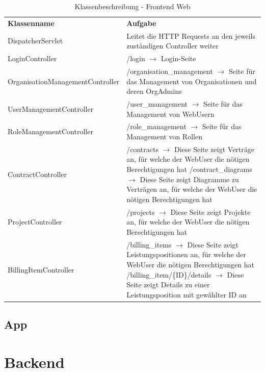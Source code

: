 \begin{table}[h]
	\centering
	\begin{tabularx}{\textwidth}{X X}
		\rowcolor[HTML]{C0C0C0} 
		\textbf{Klassenname} & \textbf{Aufgabe} \\
		DispatcherServlet & Leitet die HTTP Requests an den jeweils zuständigen Controller weiter \\
		\rowcolor[HTML]{E7E7E7} 
		LoginController & /login $\rightarrow$ Login-Seite \\
		OrganisationManagementController & /organisation_management $\rightarrow$ Seite für das Management von Organisationen und deren OrgAdmins \\
		\rowcolor[HTML]{E7E7E7} 
		UserManagementController & /user_management $\rightarrow$ Seite für das Management von WebUsern \\
		RoleManagementController & /role_management $\rightarrow$ Seite für das Management von Rollen \\
		\rowcolor[HTML]{E7E7E7} 
		ContractController & /contracts $\rightarrow$ Diese Seite zeigt Verträge an, für welche der WebUser die nötigen Berechtigungen hat \newline
		/contract_diagrams $\rightarrow$ Diese Seite zeigt Diagramme zu Verträgen an, für welche der WebUser die nötigen Berechtigungen hat \\
		ProjectController & /projects $\rightarrow$ Diese Seite zeigt Projekte an, für welche der WebUser die nötigen Berechtigungen hat \\
		\rowcolor[HTML]{E7E7E7} 
		BillingItemController & /billing_items $\rightarrow$ Diese Seite zeigt Leistungspositionen an, für welche der WebUser die nötigen Berechtigungen hat \newline
		/billing_item/\{ID\}/details $\rightarrow$ Diese Seite zeigt Details zu einer Leistungsposition mit gewählter ID an
	\end{tabularx}
	\caption{Klassenbeschreibung - Frontend Web}
	\label{table:klassenbeschreibung-web}
\end{table}

\clearpage

\subsection{App}

\section{Backend}
